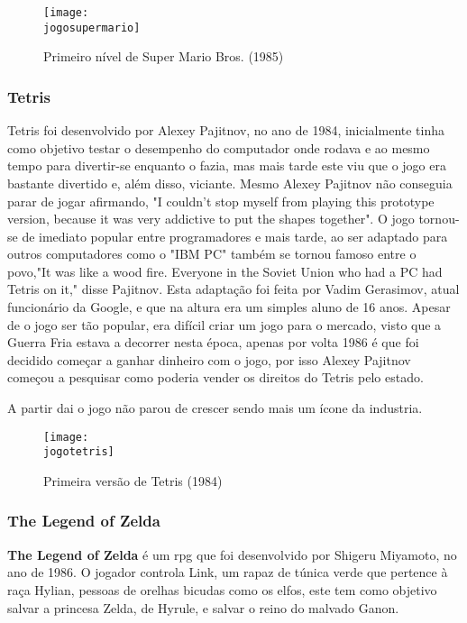 \documentclass{report}
\begin{document}
\begin{figure}[h]
\center
\texttt{[image: \\jogosupermario]}
\caption{Primeiro nível de Super Mario Bros. (1985) \cite{mariobros}}
\label{super}
\end{figure}

\subsubsection{Tetris}
\label{subsubsec.Tetris}
Tetris foi desenvolvido por Alexey Pajitnov, no ano de 1984, inicialmente tinha como objetivo testar o desempenho do computador onde rodava e ao mesmo tempo para divertir-se enquanto o fazia, mas mais tarde este viu que o jogo era bastante divertido e, além disso, viciante. Mesmo Alexey Pajitnov não conseguia parar de jogar afirmando, "I couldn't stop myself from playing this prototype version, because it was very addictive to put the shapes together". O jogo tornou-se de imediato popular entre programadores e mais tarde, ao ser adaptado para outros computadores como o "IBM PC" também se tornou famoso entre o povo,"It was like a wood fire. Everyone in the Soviet Union who had a PC had Tetris on it," disse Pajitnov. Esta adaptação foi feita por Vadim Gerasimov, atual funcionário da Google, e que na altura era um simples aluno de 16 anos. Apesar de o jogo ser tão popular, era difícil criar um jogo para o mercado, visto que a Guerra Fria estava a decorrer nesta época, apenas por volta 1986 é que foi decidido começar a ganhar dinheiro com o jogo, por isso Alexey Pajitnov começou a pesquisar como poderia vender os direitos do Tetris pelo estado.

A partir dai o jogo não parou de crescer sendo mais um ícone da industria. 

\begin{figure}[h]
\center
\texttt{[image: \\jogotetris]}
\caption{Primeira versão de Tetris (1984) \cite{tetris}}
\label{tetris}
\end{figure}


\subsubsection{The Legend of Zelda}
\label{subsubsec.The Legend of Zelda}
\textbf{The Legend of Zelda} é um \ac{rpg} que foi desenvolvido por Shigeru Miyamoto, no ano de 1986. O jogador controla Link, um rapaz de túnica verde que pertence à raça Hylian, pessoas de orelhas bicudas como os elfos, este tem como objetivo salvar a princesa Zelda, de Hyrule, e salvar o reino do malvado Ganon.
\end{document}
